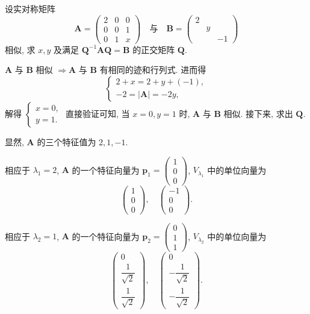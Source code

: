 \documentclass[../../main.tex]{subfiles}
\begin{document}
\begin{example}
设实对称矩阵
\[
\boldsymbol{A} = \begin{pmatrix} 2 & 0 & 0 \\ 0 & 0 & 1 \\ 0 & 1 & x \end{pmatrix}
\quad \text{与} \quad 
\boldsymbol{B} = \begin{pmatrix} 2 &  &  \\  & y &  \\  &  & -1 \end{pmatrix}
\]
相似, 求 \( x,y \) 及满足 \( \boldsymbol{Q}^{-1}\boldsymbol{AQ} = \boldsymbol{B} \) 的正交矩阵 \( \boldsymbol{Q} \).
\end{example}
\begin{solution}
\( \boldsymbol{A} \) 与 \( \boldsymbol{B} \) 相似 \( \Rightarrow \boldsymbol{A} \) 与 \( \boldsymbol{B} \) 有相同的迹和行列式. 进而得
\[
\begin{cases}
2 + x = 2 + y + (-1), \\
-2 = |\boldsymbol{A}| = -2y,
\end{cases}
\]
解得 \( \begin{cases} x = 0, \\ y = 1. \end{cases} \) 直接验证可知, 当 \( x = 0, y = 1 \) 时, \( \boldsymbol{A} \) 与 \( \boldsymbol{B} \) 相似. 接下来, 求出 \( \boldsymbol{Q} \).

显然, \( \boldsymbol{A} \) 的三个特征值为 \( 2, 1, -1 \).

相应于 \( \lambda_1 = 2 \), \( \boldsymbol{A} \) 的一个特征向量为 \( \boldsymbol{p}_1 = \begin{pmatrix} 1 \\ 0 \\ 0 \end{pmatrix} \), \( V_{\lambda_1} \) 中的单位向量为
\[
\begin{pmatrix} 1 \\ 0 \\ 0 \end{pmatrix}, \quad \begin{pmatrix} -1 \\ 0 \\ 0 \end{pmatrix}.
\]

相应于 \( \lambda_2 = 1 \), \( \boldsymbol{A} \) 的一个特征向量为 \( \boldsymbol{p}_2 = \begin{pmatrix} 0 \\ 1 \\ 1 \end{pmatrix} \), \( V_{\lambda_2} \) 中的单位向量为
\[
\begin{pmatrix} 0 \\ \dfrac{1}{\sqrt{2}} \\ \dfrac{1}{\sqrt{2}} \end{pmatrix}, \quad \begin{pmatrix} 0 \\ -\dfrac{1}{\sqrt{2}} \\ -\dfrac{1}{\sqrt{2}} \end{pmatrix}.
\]


\end{solution}
\end{document}

